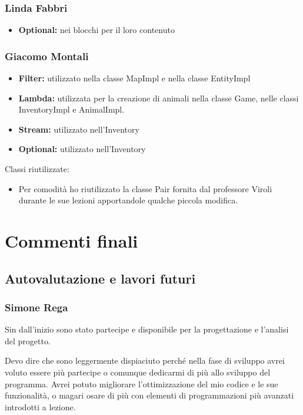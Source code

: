 \documentclass[a4paper,12pt]{report}
\begin{document}
\subsection{Linda Fabbri}

\begin{itemize}
	\item \textbf{Optional: } nei blocchi per il loro contenuto
\end{itemize}


\subsection{Giacomo Montali}

\begin{itemize}
	\item \textbf{Filter:} utilizzato nella classe MapImpl e nella classe EntityImpl
	\item \textbf{Lambda:} utilizzata per la creazione di animali nella classe Game, nelle classi InventoryImpl e AnimalImpl.
	\item \textbf{Stream:} utilizzato nell’Inventory
	\item \textbf{Optional:} utilizzato nell’Inventory
\end{itemize}
Classi riutilizzate:
\begin{itemize}
	\item Per comodità ho riutilizzato la classe Pair fornita dal professore Viroli durante le sue lezioni apportandole qualche piccola modifica.
\end{itemize}

\chapter{Commenti finali}


\section{Autovalutazione e lavori futuri}

\subsection{Simone Rega}
Sin dall'inizio sono stato partecipe e disponibile per la progettazione e l'analisi del progetto. 

Devo dire che sono leggermente dispiaciuto perché nella fase di sviluppo avrei voluto essere più partecipe o comunque dedicarmi di più allo sviluppo del programma. Avrei potuto migliorare l'ottimizzazione del mio codice e le sue funzionalità, o magari osare di più con elementi di programmazioni più avanzati introdotti a lezione. 
\end{document}
